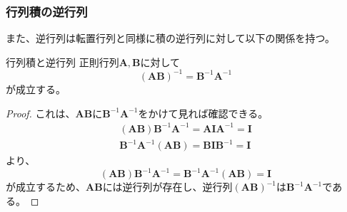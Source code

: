 \subsubsection{行列積の逆行列}
また、逆行列は転置行列と同様に積の逆行列に対して以下の関係を持つ。
\begin{theorem*}{行列積と逆行列}
	正則行列\(\boldsymbol{A},\boldsymbol{B}\)に対して
	\begin{equation}
		(\boldsymbol{A}\boldsymbol{B})^{-1}=\boldsymbol{B}^{-1}\boldsymbol{A}^{-1}
	\end{equation}
	が成立する。
\end{theorem*}
\begin{proof}
	これは、\(\boldsymbol{A}\boldsymbol{B}\)に\(\boldsymbol{B}^{-1}\boldsymbol{A}^{-1}\)をかけて見れば確認できる。
	\begin{equation}
		\begin{aligned}
			(\boldsymbol{A}\boldsymbol{B})\boldsymbol{B}^{-1}\boldsymbol{A}^{-1}=\boldsymbol{A}\boldsymbol{I}\boldsymbol{A}^{-1}=\boldsymbol{I} \\
			\boldsymbol{B}^{-1}\boldsymbol{A}^{-1}(\boldsymbol{A}\boldsymbol{B})=\boldsymbol{B}\boldsymbol{I}\boldsymbol{B}^{-1}=\boldsymbol{I}
		\end{aligned}
	\end{equation}
	より、
	\begin{equation}
		(\boldsymbol{A}\boldsymbol{B})\boldsymbol{B}^{-1}\boldsymbol{A}^{-1}=\boldsymbol{B}^{-1}\boldsymbol{A}^{-1}(\boldsymbol{A}\boldsymbol{B})=\boldsymbol{I}
	\end{equation}
	が成立するため、\(\boldsymbol{A}\boldsymbol{B}\)には逆行列が存在し、逆行列\((\boldsymbol{A}\boldsymbol{B})^{-1}\)は\(\boldsymbol{B}^{-1}\boldsymbol{A}^{-1}\)である。
\end{proof}
